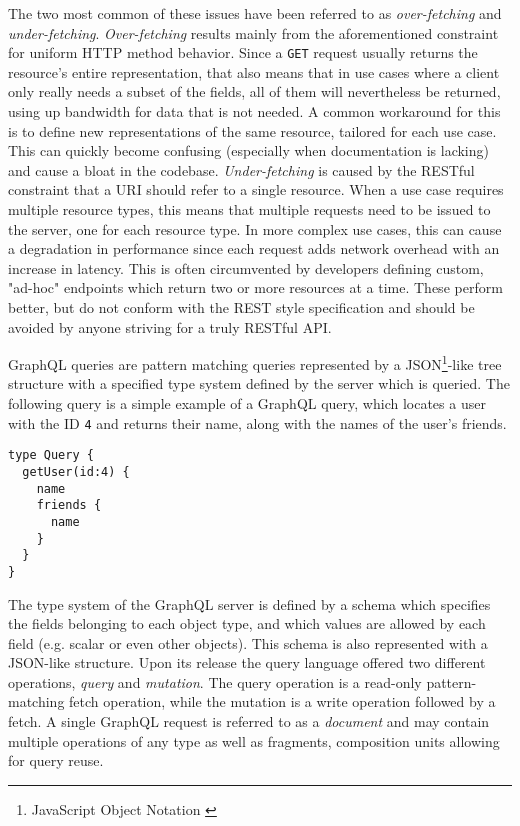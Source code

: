 The two most common of these issues have been referred to as \textit{over-fetching} and \textit{under-fetching}. \textit{Over-fetching} results mainly from the aforementioned constraint for uniform HTTP method behavior. Since a \texttt{GET} request usually returns the resource's entire representation, that also means that in use cases where a client only really needs a subset of the fields, all of them will nevertheless be returned, using up bandwidth for data that is not needed. A common workaround for this is to define new representations of the same resource, tailored for each use case. This can quickly become confusing (especially when documentation is lacking) and cause a bloat in the codebase.
\textit{Under-fetching} is caused by the RESTful constraint that a URI should refer to a single resource. When a use case requires multiple resource types, this means that multiple requests need to be issued to the server, one for each resource type. In more complex use cases, this can cause a degradation in performance since each request adds network overhead with an increase in latency. This is often circumvented by developers defining custom, "ad-hoc" endpoints which return two or more resources at a time. These perform better, but do not conform with the REST style specification and should be avoided by anyone striving for a truly RESTful API.

GraphQL queries are pattern matching queries represented by a JSON\footnote{JavaScript Object Notation \cite{json}}-like tree structure with a specified type system defined by the server which is queried. The following query is a simple example of a GraphQL query, which locates a user with the ID \texttt{4} and returns their name, along with the names of the user's friends.
\begin{lstlisting}
type Query {
  getUser(id:4) {
    name
    friends {
      name
    }
  }
}
\end{lstlisting}
The type system of the GraphQL server is defined by a schema which specifies the fields belonging to each object type, and which values are allowed by each field (e.g. scalar or even other objects). This schema is also represented with a JSON-like structure.
Upon its release the query language offered two different operations, \textit{query} and \textit{mutation}. The query operation is a read-only pattern-matching fetch operation, while the mutation is a write operation followed by a fetch. A single GraphQL request is referred to as a \textit{document} and may contain multiple operations of any type as well as fragments, composition units allowing for query reuse.


